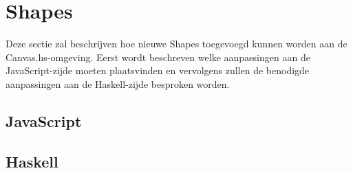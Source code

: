 \section{Shapes}
Deze sectie zal beschrijven hoe nieuwe Shapes toegevoegd kunnen worden aan de Canvas.hs-omgeving. Eerst wordt beschreven welke aanpassingen aan de JavaScript-zijde moeten plaatsvinden en vervolgens zullen de benodigde aanpassingen aan de Haskell-zijde besproken worden.

\subsection{JavaScript}


\subsection{Haskell}


